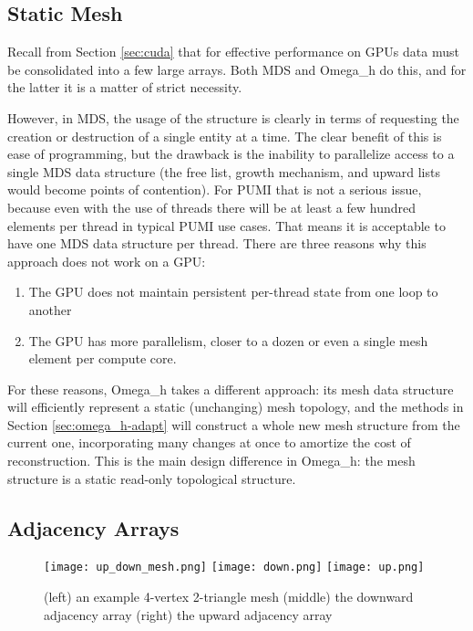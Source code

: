 \subsection{Static Mesh}

Recall from Section \ref{sec:cuda} that for effective
performance on GPUs data must be consolidated into
a few large arrays.
Both MDS and Omega\_h do this, and for the latter it is
a matter of strict necessity.

However, in MDS, the usage of the structure is clearly in terms
of requesting the creation or destruction of a single entity at
a time.
The clear benefit of this is ease of programming, but the drawback
is the inability to parallelize access to a single MDS data structure
(the free list, growth mechanism, and upward lists would become
points of contention).
For PUMI that is not a serious issue, because even with the use of
threads there will be at least a few hundred elements per thread
in typical PUMI use cases.
That means it is acceptable to have one MDS data structure per thread.
There are three reasons why this approach does not work on a GPU:
\begin{enumerate}
\item The GPU does not maintain persistent per-thread state from
one loop to another
\item The GPU has more parallelism, closer to a dozen or even
a single mesh element per compute core.
\end{enumerate}
For these reasons, Omega\_h takes a different approach:
its mesh data structure will efficiently represent a static
(unchanging) mesh topology, and the methods in Section \ref{sec:omega_h-adapt}
will construct a whole new mesh structure from the current
one, incorporating many changes at once to amortize the
cost of reconstruction.
This is the main design difference in Omega\_h: the mesh
structure is a static read-only topological structure.

\subsection{Adjacency Arrays}

\begin{figure}
\begin{center}
\texttt{[image: up\_down\_mesh.png]}
\texttt{[image: down.png]}
\texttt{[image: up.png]}
\caption{(left) an example 4-vertex 2-triangle mesh
(middle) the downward adjacency array
(right) the upward adjacency array}
\label{fig:osh_up_down}
\end{center}
\end{figure}

